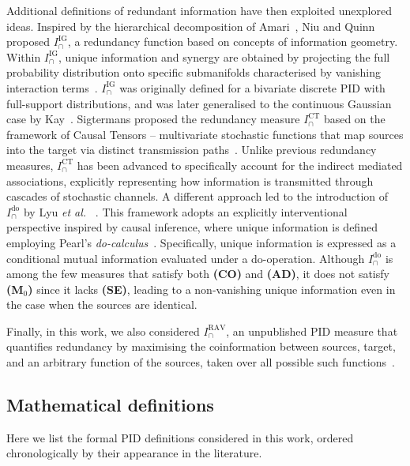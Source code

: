 \documentclass{article}
\makeatletter
\newcommand{\etal}{\textit{et al.\@} }
\newcommand{\ts}[1]{\ensuremath{_{\text{#1}}}}
\newcommand{\Mz}{\textbf{(M\ts{0})}\xspace} %
\newcommand{\AD}{\textbf{(AD)}\xspace} %
\newcommand{\CO}{\textbf{(CO)}\xspace} %
\newcommand{\SE}{\textbf{(SE)}\xspace} %
\newcommand{\ICT}{\ensuremath{I_\cap^{\text{CT}}}\xspace}
\newcommand{\IIG}{\ensuremath{I_\cap^{\text{IG}}}\xspace}
\newcommand{\Ido}{\ensuremath{I_\cap^{\text{do}}}\xspace}
\newcommand{\IRAV}{\ensuremath{I_\cap^{\text{RAV}}}\xspace}
\makeatother
\begin{document}
Additional definitions of redundant information have then exploited unexplored ideas. Inspired by the hierarchical decomposition of Amari~\cite{amari2001information}, Niu and Quinn proposed \IIG, a redundancy function based on concepts of information geometry. Within \IIG, unique information and synergy are obtained by projecting the full probability distribution onto specific submanifolds characterised by vanishing interaction terms~\cite{niu2019measure}. \IIG was originally defined for a bivariate discrete PID with full-support distributions, and was later generalised to the continuous Gaussian case by Kay~\cite{kay2024partial}. 
Sigtermans proposed the redundancy measure \ICT based on the framework of Causal Tensors -- multivariate stochastic functions that map sources into the target via distinct transmission paths~\cite{sigtermans2020towards, sigtermans2020partial}. Unlike previous redundancy measures, \ICT has been advanced to specifically account for the indirect mediated associations, explicitly representing how information is transmitted through cascades of stochastic channels. 
A different approach led to the introduction of \Ido by Lyu \etal~\cite{lyu2024explicit}. This framework adopts an explicitly interventional perspective inspired by causal inference, where unique information is defined employing Pearl's \textit{do-calculus}~\cite{pearl1995causal, pearl2009causal, pearl2012calculus}. Specifically, unique information is expressed as a conditional mutual information evaluated under a do-operation.
Although \Ido is among the few measures that satisfy both \CO and \AD, it does not satisfy \Mz since it lacks \SE, leading to a non-vanishing unique information even in the case when the sources are identical.

Finally, in this work, we also considered \IRAV, an unpublished PID measure that quantifies redundancy by maximising the coinformation between sources, target, and an arbitrary function of the sources, taken over all possible such functions~\cite{james2018dit}.


\subsection{Mathematical definitions}
\label{sec:measures_mathy}
Here we list the formal PID definitions considered in this work, ordered chronologically by their appearance in the literature.
\end{document}
